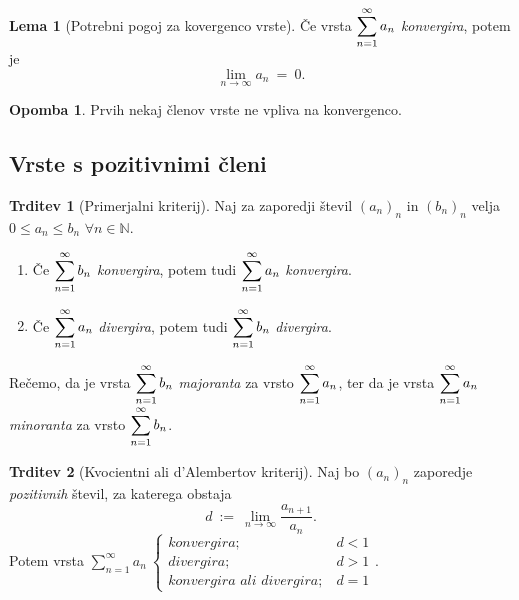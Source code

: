 \documentclass[11pt]{article}
\newcommand{\N}{\mathbb{N}}
\theoremstyle{definition}
\theoremstyle{definition}
\newtheorem{trditev}{Trditev}[section]
\theoremstyle{definition}
\theoremstyle{theorem}
\newtheorem{lema}{Lema}
\newtheorem*{opomba}{Opomba}
\begin{document}
\begin{lema}[Potrebni pogoj za kovergenco vrste]

Če vrsta $\mathlarger{\sum_{n=1}^\infty a_n}$ \textit{konvergira}, potem je 
$$\lim_{n \rightarrow \infty} a_n ~=~ 0.$$

\end{lema}
\vspace{0.5cm}

\begin{opomba}

Prvih nekaj členov vrste ne vpliva na konvergenco.

\end{opomba}
\vspace{0.5cm}

\pagebreak


\subsection{Vrste s pozitivnimi členi}
\vspace{0.5cm}

\begin{trditev}[Primerjalni kriterij]

Naj za zaporedji števil $(a_n)_n$ in $(b_n)_n$ velja $0 \leq a_n \leq b_n$ $\forall n \in \N$.
\begin{enumerate}

	\item[(1)] Če $\mathlarger{\sum_{n=1}^\infty b_n}$ \textit{konvergira}, potem tudi $\mathlarger{\sum_{n=1}^\infty a_n}$ \textit{konvergira}.
	
	\item[(2)] Če $\mathlarger{\sum_{n=1}^\infty a_n}$ \textit{divergira}, potem tudi $\mathlarger{\sum_{n=1}^\infty b_n}$ \textit{divergira}.

\end{enumerate}
Rečemo, da je vrsta $\mathlarger{\sum_{n=1}^\infty b_n}$ \textit{majoranta} za vrsto $\mathlarger{\sum_{n=1}^\infty a_n}$, ter da je vrsta $\mathlarger{\sum_{n=1}^\infty a_n}$ \textit{minoranta} za vrsto $\mathlarger{\sum_{n=1}^\infty b_n}$.

\end{trditev}
\vspace{0.5cm}

\begin{trditev}[Kvocientni ali d'Alembertov kriterij]

Naj bo $(a_n)_n$ zaporedje \textit{pozitivnih} števil, za katerega obstaja
$$d ~:=~ \lim_{n \rightarrow \infty} \frac{a_{n+1}}{a_n}.$$
Potem vrsta $\sum_{n=1}^\infty a_n ~ \begin{cases}
\textit{konvergira}; ~&d<1\\
\textit{divergira}; ~&d>1 \\
\textit{konvergira ali divergira}; ~&d=1
\end{cases}.$ 

\end{trditev}
\vspace{0.5cm}
\end{document}
